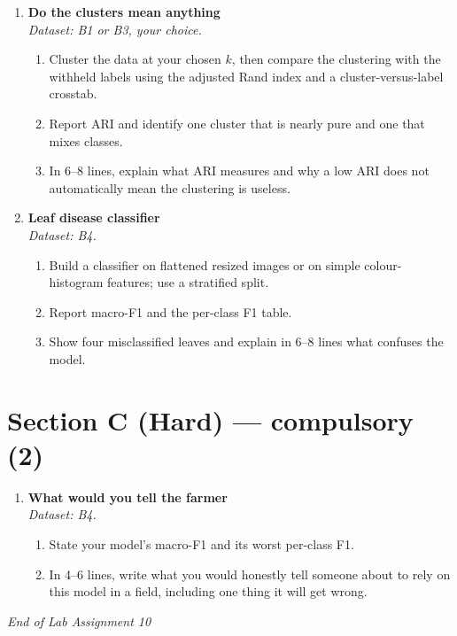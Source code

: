 \documentclass[11pt,a4paper]{article}
\begin{document}
\begin{enumerate}[label=\textbf{B\arabic*.}, leftmargin=*]

  \item \textbf{Do the clusters mean anything} \\
    \emph{Dataset: B1 or B3, your choice.}
    \begin{enumerate}[label=(\alph*), leftmargin=*]
      \item Cluster the data at your chosen $k$, then compare the clustering with the withheld labels using the adjusted Rand index and a cluster-versus-label crosstab.
      \item Report ARI and identify one cluster that is nearly pure and one that mixes classes.
      \item In 6--8 lines, explain what ARI measures and why a low ARI does not automatically mean the clustering is useless.
    \end{enumerate}

  \item \textbf{Leaf disease classifier} \\
    \emph{Dataset: B4.}
    \begin{enumerate}[label=(\alph*), leftmargin=*]
      \item Build a classifier on flattened resized images or on simple colour-histogram features; use a stratified split.
      \item Report macro-F1 and the per-class F1 table.
      \item Show four misclassified leaves and explain in 6--8 lines what confuses the model.
    \end{enumerate}

\end{enumerate}

\section*{Section C (Hard) --- compulsory \quad (2)}

\begin{enumerate}[label=\textbf{C\arabic*.}, leftmargin=*]

  \item \textbf{What would you tell the farmer} \\
    \emph{Dataset: B4.}
    \begin{enumerate}[label=(\alph*), leftmargin=*]
      \item State your model's macro-F1 and its worst per-class F1.
      \item In 4--6 lines, write what you would honestly tell someone about to rely on this model in a field, including one thing it will get wrong.
    \end{enumerate}

\end{enumerate}

\vfill\noindent\textit{End of Lab Assignment 10}

\notesources{\AMLLabSources}
\end{document}
